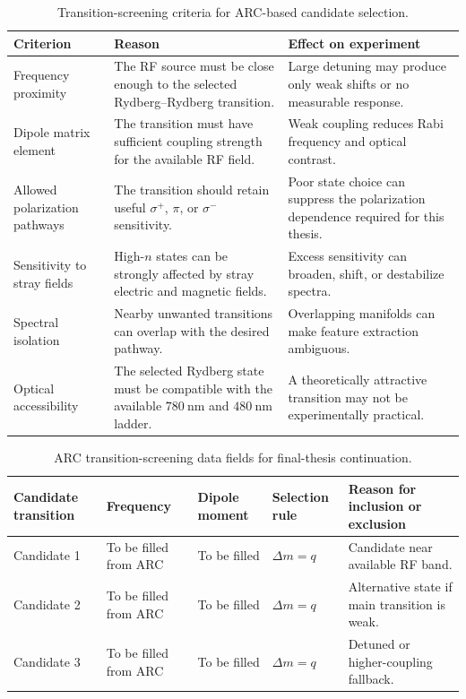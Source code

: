 \documentclass{ieeeaccess}
\begin{document}
\begin{table}[!t]
\caption{Transition-screening criteria for ARC-based candidate selection.}
\label{tab:annex_arc_screening}
\centering
\renewcommand{\arraystretch}{1.12}
\scriptsize
\begin{tabular}{p{} p{} p{}}
\hline
\textbf{Criterion} & \textbf{Reason} & \textbf{Effect on experiment} \\
\hline
Frequency proximity &
The RF source must be close enough to the selected Rydberg--Rydberg transition. &
Large detuning may produce only weak shifts or no measurable response. \\

Dipole matrix element &
The transition must have sufficient coupling strength for the available RF field. &
Weak coupling reduces Rabi frequency and optical contrast. \\

Allowed polarization pathways &
The transition should retain useful \(\sigma^+\), \(\pi\), or \(\sigma^-\) sensitivity. &
Poor state choice can suppress the polarization dependence required for this thesis. \\

Sensitivity to stray fields &
High-\(n\) states can be strongly affected by stray electric and magnetic fields. &
Excess sensitivity can broaden, shift, or destabilize spectra. \\

Spectral isolation &
Nearby unwanted transitions can overlap with the desired pathway. &
Overlapping manifolds can make feature extraction ambiguous. \\

Optical accessibility &
The selected Rydberg state must be compatible with the available \(780~\mathrm{nm}\) and \(480~\mathrm{nm}\) ladder. &
A theoretically attractive transition may not be experimentally practical. \\
\hline
\end{tabular}
\end{table}

\begin{table}[!t]
\caption{ARC transition-screening data fields for final-thesis continuation.}
\label{tab:annex_arc_screening_template}
\centering
\renewcommand{\arraystretch}{1.12}
\scriptsize
\begin{tabular}{p{} p{} p{} p{} p{}}
\hline
\textbf{Candidate transition} & \textbf{Frequency} & \textbf{Dipole moment} & \textbf{Selection rule} & \textbf{Reason for inclusion or exclusion} \\
\hline
Candidate 1 & To be filled from ARC & To be filled & \(\Delta m=q\) & Candidate near available RF band. \\
Candidate 2 & To be filled from ARC & To be filled & \(\Delta m=q\) & Alternative state if main transition is weak. \\
Candidate 3 & To be filled from ARC & To be filled & \(\Delta m=q\) & Detuned or higher-coupling fallback. \\
\hline
\end{tabular}
\end{table}
\end{document}
